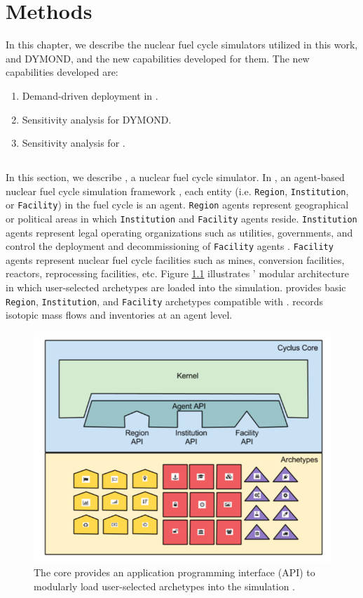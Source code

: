 \chapter{Methods}
\label{chap:3}
In this chapter, we describe the nuclear fuel cycle simulators utilized in this work, 
\Cyclus and DYMOND, and the new capabilities developed for them. 
The new capabilities developed are: 
\begin{enumerate} 
\item Demand-driven deployment in \Cyclus. 
\item Sensitivity analysis for DYMOND.
\item Sensitivity analysis for \Cyclus. 
\end{enumerate}

\section{\Cyclus}
In this section, we describe \Cyclus, a nuclear fuel cycle simulator.
In \Cyclus, an agent-based nuclear fuel cycle simulation framework 
\cite{huff_fundamental_2016}, 
each entity (i.e. \texttt{Region}, \texttt{Institution}, or \texttt{Facility}) in the 
fuel cycle is an agent. 
\texttt{Region} agents represent geographical or political areas 
in which \texttt{Institution}
and \texttt{Facility} agents reside. 
\texttt{Institution} agents represent legal operating organizations such as
utilities, governments, and control the 
deployment and decommissioning of \texttt{Facility} agents
\cite{huff_fundamental_2016}.
\texttt{Facility} agents represent nuclear fuel cycle facilities
such as mines, conversion facilities, reactors, reprocessing facilities, 
etc. 
Figure \ref{fig:cyclus} illustrates \Cyclus' modular architecture in which 
user-selected archetypes are loaded into the simulation.  
\Cycamore \cite{carlsen_cycamore_2014}
provides basic \texttt{Region}, \texttt{Institution}, 
and \texttt{Facility} archetypes compatible with \Cyclus. 
\Cyclus records isotopic mass flows and inventories at an agent level.

\begin{figure}[]
	\begin{center}
		\includegraphics[width=0.7\linewidth]{./figures/cyclus}
	\end{center}	
        \caption{The \Cyclus core provides an application programming interface 
        (API) to modularly load user-selected archetypes into the \Cyclus simulation
         \cite{huff_fundamental_2016}.}
	\label{fig:cyclus}
\end{figure}

